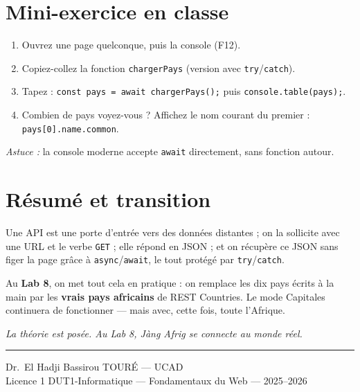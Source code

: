 \documentclass[11pt,a4paper]{article}
\newcommand{\code}[1]{\texttt{#1}}
\begin{document}
\section{Mini-exercice en classe}

\begin{objectifbox}
\begin{enumerate}[leftmargin=*]
  \item Ouvrez une page quelconque, puis la console (F12).
  \item Copiez-collez la fonction \code{chargerPays} (version avec \code{try}/\code{catch}).
  \item Tapez : \code{const pays = await chargerPays();} puis \code{console.table(pays);}.
  \item Combien de pays voyez-vous ? Affichez le nom courant du premier : \code{pays[0].name.common}.
\end{enumerate}
\emph{Astuce :} la console moderne accepte \code{await} directement, sans fonction autour.
\end{objectifbox}

\section{Résumé et transition}

Une API est une porte d'entrée vers des données distantes ; on la sollicite avec une URL et le verbe \code{GET} ; elle répond en JSON ; et on récupère ce JSON sans figer la page grâce à \code{async}/\code{await}, le tout protégé par \code{try}/\code{catch}.

Au \textbf{Lab 8}, on met tout cela en pratique : on remplace les dix pays écrits à la main par les \textbf{vrais pays africains} de REST Countries. Le mode Capitales continuera de fonctionner --- mais avec, cette fois, toute l'Afrique.

\begin{center}
\textit{La théorie est posée. Au Lab 8, Jàng Afrig se connecte au monde réel.}
\end{center}

\bigskip
\noindent\rule{\textwidth}{0.4pt}
\begin{center}
\small Dr.~El Hadji Bassirou TOURÉ --- UCAD\\
\small Licence 1 DUT1-Informatique --- Fondamentaux du Web --- 2025--2026
\end{center}
\end{document}

